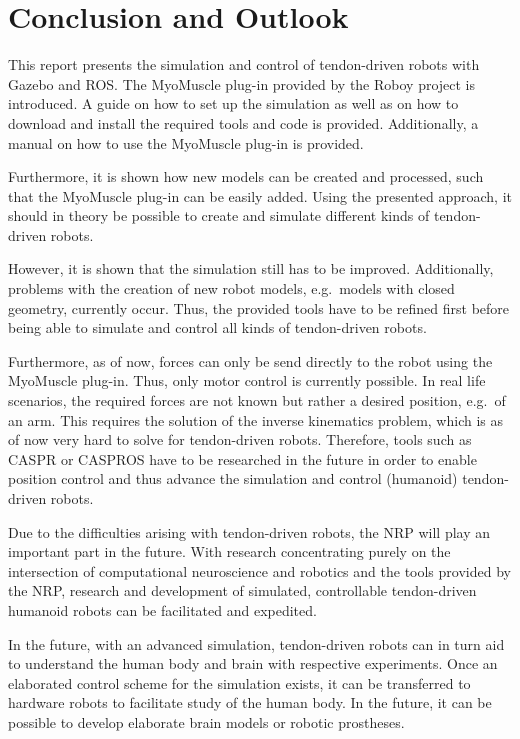 
\chapter{Conclusion and Outlook}\label{chapter:conclusion}

This report presents the simulation and control of tendon-driven robots with Gazebo and ROS. The MyoMuscle plug-in provided by the Roboy project is introduced. A guide on how to set up the simulation as well as on how to download and install the required tools and code is provided. Additionally, a manual on how to use the MyoMuscle plug-in is provided.

Furthermore, it is shown how new models can be created and processed, such that the MyoMuscle plug-in can be easily added. Using the presented approach, it should in theory be possible to create and simulate different kinds of tendon-driven robots.

However, it is shown that the simulation still has to be improved. Additionally, problems with the creation of new robot models, e.g.\ models with closed geometry, currently occur. Thus, the provided tools have to be refined first before being able to simulate and control all kinds of tendon-driven robots.

Furthermore, as of now, forces can only be send directly to the robot using the MyoMuscle plug-in. Thus, only motor control is currently possible. In real life scenarios, the required forces are not known but rather a desired position, e.g.\ of an arm. This requires the solution of the inverse kinematics problem, which is as of now very hard to solve for tendon-driven robots. Therefore, tools such as CASPR or CASPROS have to be researched in the future in order to enable position control and thus advance the simulation and control (humanoid) tendon-driven robots.

Due to the difficulties arising with tendon-driven robots, the NRP will play an important part in the future. With research concentrating purely on the intersection of computational neuroscience and robotics and the tools provided by the NRP, research and development of simulated, controllable tendon-driven humanoid robots can be facilitated and expedited.

In the future, with an advanced simulation, tendon-driven robots can in turn aid to understand the human body and brain with respective experiments. Once an elaborated control scheme for the simulation exists, it can be transferred to hardware robots to facilitate study of the human body. In the future, it can be possible to develop elaborate brain models or robotic prostheses.